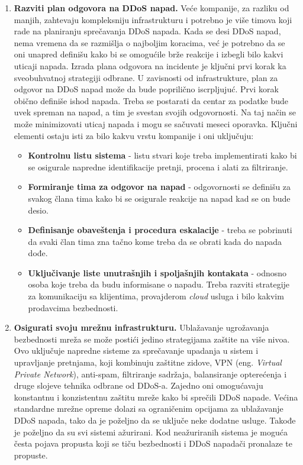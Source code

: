 \documentclass[a4paper]{article}
\theoremstyle{break}
\begin{document}
{\begin{enumerate}

\item \textbf{Razviti plan odgovora na DDoS napad.} Veće kompanije, za razliku od manjih, zahtevaju kompleksniju infrastrukturu i potrebno je više timova koji rade na planiranju sprečavanja DDoS napada. Kada se desi DDoS napad, nema vremena da se razmišlja o najboljim koracima, već je potrebno da se oni unapred definišu kako bi se omogućile brže reakcije i izbegli bilo kakvi uticaji napada. Izrada plana odgovora na incidente je ključni prvi korak ka sveobuhvatnoj strategiji odbrane. U zavisnosti od infrastrukture, plan za odgovor na DDoS napad može da bude poprilično iscrpljujuć. Prvi korak obično definiše ishod napada. Treba se postarati da centar za podatke bude uvek spreman na napad, a tim je svestan svojih odgovornosti. Na taj način se može minimizovati uticaj napada i mogu se sačuvati meseci oporavka. Ključni elementi ostaju isti za bilo kakvu vrstu kompanije i oni uključuju:
\begin{itemize}
\item \textbf{Kontrolnu listu sistema} - listu stvari koje treba implementirati kako bi se osigurale napredne identifikacije pretnji, procena i alati za filtriranje.
\item \textbf{Formiranje tima za odgovor na napad} - odgovornosti se definišu za svakog člana tima kako bi se osigurale reakcije na napad kad se on bude desio.
\item \textbf{Definisanje obaveštenja i procedura eskalacije} - treba se pobrinuti da svaki član tima zna tačno kome treba da se obrati kada do napada dođe.
\item \textbf{Uključivanje liste unutrašnjih i spoljašnjih kontakata} - odnosno osoba koje treba da budu informisane o napadu. Treba razviti strategije za komunikaciju sa klijentima, provajderom \textit{cloud} usluga i bilo kakvim prodavcima bezbednosti.
\end{itemize}

\item \textbf{Osigurati svoju mrežnu infrastrukturu.} Ublažavanje ugrožavanja bezbednosti mreža se može postići jedino strategijama zaštite na više nivoa. Ovo uključuje napredne sisteme za sprečavanje upadanja u sistem i upravljanje pretnjama, koji kombinuju zaštitne zidove, VPN (eng. \textit{Virtual Private Network}), anti-spam, filtriranje sadržaja, balansiranje opterećenja i druge slojeve tehnika odbrane od DDoS-a. Zajedno oni omogućavaju konstantnu i konzistentnu zaštitu mreže kako bi sprečili DDoS napade.
Većina standardne mrežne opreme dolazi sa ograničenim opcijama za ublažavanje DDoS napada, tako da je poželjno da se uključe neke dodatne usluge. Takođe je poželjno da su svi sistemi ažurirani. Kod neažuriranih sistema je moguća česta pojava propusta koji se tiču bezbednosti i DDoS napadači pronalaze te propuste.


\end{enumerate}}
\end{document}

